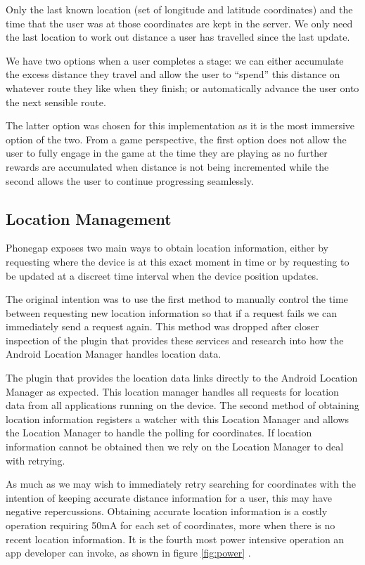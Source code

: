 Only the last known location (set of longitude and latitude
coordinates) and the time that the user was at those coordinates are
kept in the server. We only need the last location 
to work out distance a user has travelled since the last update. 

We have two options when a user completes a stage: we can either
accumulate the excess distance they travel and allow the user to
``spend'' this distance on whatever route they like when they finish;
or automatically advance the user onto the next sensible route. 

The latter option was chosen for this implementation as it is the most
immersive option of the two. From a game perspective, the first option
does not allow the user to fully engage in the game at the time they
are playing as no further rewards are accumulated when distance is not
being incremented while the second allows the user to continue
progressing seamlessly. 

\subsection{Location Management}
\label{sec:location_mgmt}
Phonegap exposes two main ways to obtain location information, either
by requesting where the device is at this exact moment in
time\cite{phonegap_currentpos} or by requesting to be updated at a
discreet time interval when the device position
updates\cite{phonegap_watchpos}. 

The original intention was to use the first method to manually control
the time between requesting new location information so that if a
request fails we can immediately send a request again. This method was
dropped after closer inspection of the plugin that provides these
services and research into how the Android Location Manager handles
location data.

The plugin that provides the location data links directly to the
Android Location Manager as expected. This location manager handles
all requests for location data from all applications running on the
device. The second method of obtaining location information registers
a watcher with this Location Manager and allows the Location Manager
to handle the polling for coordinates. If location information cannot
be obtained then we rely on the Location Manager to deal with
retrying. 

As much as we may wish to immediately retry searching for coordinates
with the intention of keeping accurate distance information for a
user, this may have negative repercussions. Obtaining accurate
location information is a costly operation requiring 50mA for each set
of coordinates, more when there is no recent location
information\cite{android_power}. It is the fourth most power intensive
operation an app developer can invoke, as shown in figure
\ref{fig:power} \cite{android_efficiencySlides}.


